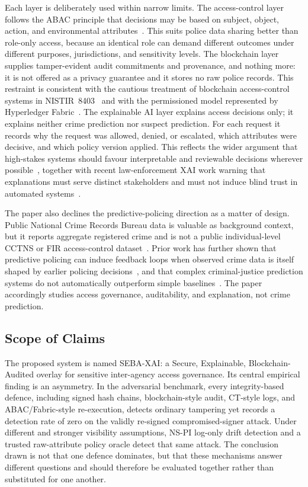 Each layer is deliberately used within narrow limits. The access-control layer
follows the ABAC principle that decisions may be based on subject, object,
action, and environmental attributes~\cite{nist_abac_2014}. This suits police
data sharing better than role-only access, because an identical role can demand
different outcomes under different purposes, jurisdictions, and sensitivity
levels. The blockchain layer supplies tamper-evident audit commitments and
provenance, and nothing more: it is not offered as a privacy guarantee and it
stores no raw police records. This restraint is consistent with the cautious
treatment of blockchain access-control systems in
NISTIR~8403~\cite{nist_blockchain_access_2022} and with the permissioned model
represented by Hyperledger Fabric~\cite{androulaki_fabric_2018}. The
explainable AI layer explains access decisions only; it explains neither crime
prediction nor suspect prediction. For each request it records why the request
was allowed, denied, or escalated, which attributes were decisive, and which
policy version applied. This reflects the wider argument that high-stakes
systems should favour interpretable and reviewable decisions wherever
possible~\cite{rudin_2019}, together with recent law-enforcement XAI work
warning that explanations must serve distinct stakeholders and must not induce
blind trust in automated systems~\cite{zocholl_xai_law_enforcement_2025}.

The paper also declines the predictive-policing direction as a matter of
design. Public National Crime Records Bureau data is valuable as background
context, but it reports aggregate registered crime and is not a public
individual-level CCTNS or FIR access-control dataset~\cite{ncrb_2023}. Prior
work has further shown that predictive policing can induce feedback loops when
observed crime data is itself shaped by earlier policing
decisions~\cite{ensign_feedback_2018}, and that complex criminal-justice
prediction systems do not automatically outperform simple
baselines~\cite{dressel_fairness_limits_2018}. The paper accordingly studies
access governance, auditability, and explanation, not crime prediction.

\subsection{Scope of Claims}

The proposed system is named SEBA-XAI: a Secure, Explainable,
Blockchain-Audited overlay for sensitive inter-agency access governance. Its
central empirical finding is an asymmetry. In the adversarial benchmark, every
integrity-based defence, including signed hash chains, blockchain-style audit,
CT-style logs, and ABAC/Fabric-style re-execution, detects ordinary tampering
yet records a detection rate of zero on the validly re-signed
compromised-signer attack. Under different and stronger visibility assumptions,
NS-PI log-only drift detection and a trusted raw-attribute policy oracle detect
that same attack. The conclusion drawn is not that one defence dominates, but
that these mechanisms answer different questions and should therefore be
evaluated together rather than substituted for one another.

